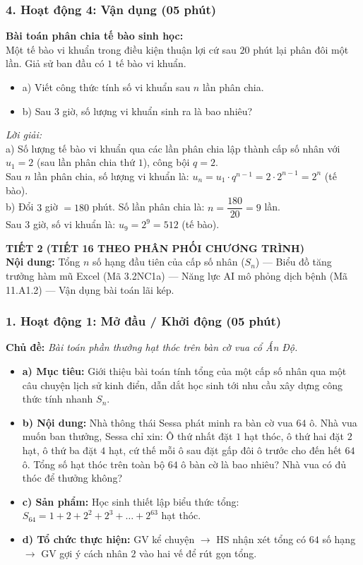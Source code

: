 \documentclass[12pt, a4paper]{article}
\begin{document}
\subsubsection*{4. Hoạt động 4: Vận dụng (05 phút)}
\textbf{Bài toán phân chia tế bào sinh học:}\\
Một tế bào vi khuẩn trong điều kiện thuận lợi cứ sau $20$ phút lại phân đôi một lần. Giả sử ban đầu có $1$ tế bào vi khuẩn.
\begin{itemize}
    \item a) Viết công thức tính số vi khuẩn sau $n$ lần phân chia.
    \item b) Sau $3$ giờ, số lượng vi khuẩn sinh ra là bao nhiêu?
\end{itemize}
\textit{Lời giải:}\\
a) Số lượng tế bào vi khuẩn qua các lần phân chia lập thành cấp số nhân với $u_1 = 2$ (sau lần phân chia thứ $1$), công bội $q = 2$.\\
Sau $n$ lần phân chia, số lượng vi khuẩn là: $u_n = u_1 \cdot q^{n-1} = 2 \cdot 2^{n-1} = 2^n$ (tế bào).\\
b) Đổi $3$ giờ $= 180$ phút. Số lần phân chia là: $n = \dfrac{180}{20} = 9$ lần.\\
Sau $3$ giờ, số vi khuẩn là: $u_9 = 2^9 = 512$ (tế bào).


\newpage


{\large \textbf{TIẾT 2 (TIẾT 16 THEO PHÂN PHỐI CHƯƠNG TRÌNH)}}\\[0.3em]
\textbf{Nội dung:} Tổng $n$ số hạng đầu tiên của cấp số nhân ($S_n$) --- Biểu đồ tăng trưởng hàm mũ Excel (Mã 3.2NC1a) --- Năng lực AI mô phỏng dịch bệnh (Mã 11.A1.2) --- Vận dụng bài toán lãi kép.


\subsubsection*{1. Hoạt động 1: Mở đầu / Khởi động (05 phút)}
\textbf{Chủ đề:} \textit{Bài toán phần thưởng hạt thóc trên bàn cờ vua cổ Ấn Độ.}
\begin{itemize}
    \item \textbf{a) Mục tiêu:} Giới thiệu bài toán tính tổng của một cấp số nhân qua một câu chuyện lịch sử kinh điển, dẫn dắt học sinh tới nhu cầu xây dựng công thức tính nhanh $S_n$.
    \item \textbf{b) Nội dung:} Nhà thông thái Sessa phát minh ra bàn cờ vua $64$ ô. Nhà vua muốn ban thưởng, Sessa chỉ xin: Ô thứ nhất đặt $1$ hạt thóc, ô thứ hai đặt $2$ hạt, ô thứ ba đặt $4$ hạt, cứ thế mỗi ô sau đặt gấp đôi ô trước cho đến hết $64$ ô.
    Tổng số hạt thóc trên toàn bộ $64$ ô bàn cờ là bao nhiêu? Nhà vua có đủ thóc để thưởng không?
    \item \textbf{c) Sản phẩm:} Học sinh thiết lập biểu thức tổng: $S_{64} = 1 + 2 + 2^2 + 2^3 + \dots + 2^{63}$ hạt thóc.
    \item \textbf{d) Tổ chức thực hiện:} GV kể chuyện $\to$ HS nhận xét tổng có $64$ số hạng $\to$ GV gợi ý cách nhân $2$ vào hai vế để rút gọn tổng.
\end{itemize}
\end{document}
